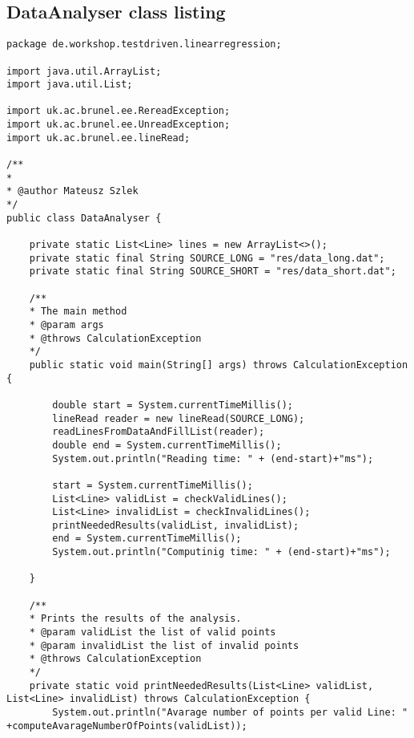 \pagebreak
\subsection{DataAnalyser class listing}
\label{subsec: analyser-class-listing}

\begin{lstlisting}
package de.workshop.testdriven.linearregression;

import java.util.ArrayList;
import java.util.List;

import uk.ac.brunel.ee.RereadException;
import uk.ac.brunel.ee.UnreadException;
import uk.ac.brunel.ee.lineRead;

/**
* 
* @author Mateusz Szlek
*/
public class DataAnalyser {
	
	private static List<Line> lines = new ArrayList<>();
	private static final String SOURCE_LONG = "res/data_long.dat";
	private static final String SOURCE_SHORT = "res/data_short.dat";
	
	/**
	* The main method
	* @param args
	* @throws CalculationException
	*/
	public static void main(String[] args) throws CalculationException {
		
		double start = System.currentTimeMillis();
		lineRead reader = new lineRead(SOURCE_LONG);
		readLinesFromDataAndFillList(reader);
		double end = System.currentTimeMillis();
		System.out.println("Reading time: " + (end-start)+"ms");
		
		start = System.currentTimeMillis();
		List<Line> validList = checkValidLines();
		List<Line> invalidList = checkInvalidLines();
		printNeededResults(validList, invalidList);
		end = System.currentTimeMillis();
		System.out.println("Computinig time: " + (end-start)+"ms");
		
	}
	
	/**
	* Prints the results of the analysis.
	* @param validList the list of valid points
	* @param invalidList the list of invalid points
	* @throws CalculationException
	*/
	private static void printNeededResults(List<Line> validList, List<Line> invalidList) throws CalculationException {
		System.out.println("Avarage number of points per valid Line: " +computeAvarageNumberOfPoints(validList));
		

\end{lstlisting}
